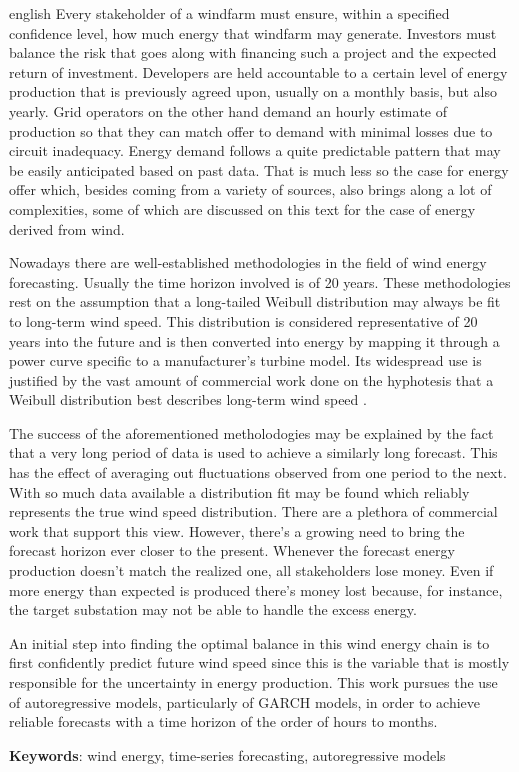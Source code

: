 \documentclass[
	12pt,				%
	openright,			%
	oneside,			%
	a4paper,			%
	english,			%
	french,				%
	spanish,			%
	brazil				%
	]{abntex2}
\begin{document}
\begin{resumo}[Abstract]
 \begin{otherlanguage*}{english}
	Every stakeholder of a windfarm must ensure, within a specified confidence level, how much energy that windfarm may generate. Investors must balance the risk that goes along with financing such a project and the expected return of investment. Developers are held accountable to a certain level of energy production that is previously agreed upon, usually on a monthly basis, but also yearly. Grid operators on the other hand demand an hourly estimate of production so that they can match offer to demand with minimal losses due to circuit inadequacy. Energy demand follows a quite predictable pattern that may be easily anticipated based on past data. That is much less so the case for energy offer which, besides coming from a variety of sources, also brings along a lot of complexities, some of which are discussed on this text for the case of energy derived from wind.
	
	Nowadays there are well-established methodologies in the field of wind energy forecasting. Usually the time horizon involved is of 20 years. These methodologies rest on the assumption that a long-tailed Weibull distribution \cite{weibull} may always be fit to long-term wind speed. This distribution is considered representative of 20 years into the future and is then converted into energy \cite{art15} by mapping it through a power curve specific to a manufacturer's turbine model. 
Its widespread use is justified by the vast amount of commercial work done on the hyphotesis that a Weibull distribution best describes long-term wind speed \cite{art14}.

	The success of the aforementioned metholodogies may be explained by the fact that a very long period of data is used to achieve a similarly long forecast. This has the effect of averaging out fluctuations observed from one period to the next. With so much data available a distribution fit may be found which reliably represents the true wind speed distribution. There are a plethora of commercial work that support this view. However, there's a growing need to bring the forecast horizon ever closer to the present. Whenever the forecast energy production doesn't match the realized one, all stakeholders lose money. Even if more energy than expected is produced there's money lost because, for instance,  the target substation may not be able to handle the excess energy. 
	
	An initial step into finding the optimal balance in this wind energy chain is to first confidently predict future wind speed since this is the variable that is mostly responsible for the uncertainty in energy production. This work pursues the use of autoregressive models, particularly of GARCH models, in order to achieve reliable forecasts with a time horizon of the order of hours to months.

 
   \textbf{Keywords}: wind energy, time-series forecasting, autoregressive models
 \end{otherlanguage*}
\end{resumo}
\end{document}
